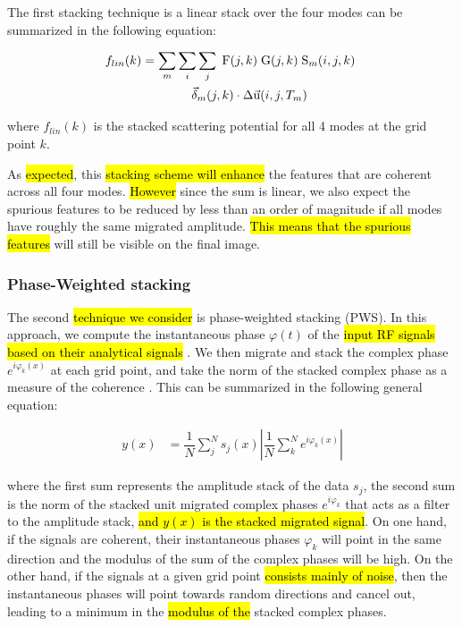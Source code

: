 \documentclass[10pt,a4paper]{article}
\begin{document}
The first stacking technique is a linear stack over the four modes can be summarized in the following equation:

\begin{align}
  f_{lin}(k) &= \sum_m \sum_i \sum_j \; \text{F}(j,k) \; \text{G}(j,k) \; \text{S}_{m}(i,j,k) \; \notag\\&\qquad\qquad \vec{\delta}_{m}(j,k) \cdot \Delta\vec{\text{u}}(i,j,T_m)
  \label{lin}
\end{align}
\vspace{1mm}

\noindent where $f_{lin}(k)$ is the stacked scattering potential for all 4 modes at the grid point $k$. 

As \hl{expected}, this \hl{stacking scheme will enhance} the features that are coherent across all four modes.
\hl{However} since the sum is linear, we also expect the spurious features to be reduced by less than an order of magnitude if all modes have roughly the same migrated amplitude.
\hl{This means that the spurious features} will still be visible on the final image.

\subsubsection{Phase-Weighted stacking}

The second \hl{technique we consider} is phase-weighted stacking (PWS).
In this approach, we compute the instantaneous phase $\varphi(t)$ of the \hl{input RF signals based on their analytical signals} \citep{schi_gji_97,cost_gphy_18}.
We then migrate and stack the complex phase $e^{i\varphi_k(x)}$ at each grid point, and take the norm of the stacked complex phase as a measure of the coherence \citep{coop_saga_07}.
This can be summarized in the following general equation:

\begin{align}
  y(x) &= \dfrac{1}{N} \sum_j^N s_j(x) \left\vert \dfrac{1}{N} \sum_k^N e^{i\varphi_k(x)} \right\vert
  \label{pws_1}
\end{align}
\vspace{1mm}

\noindent where the first sum represents the amplitude stack of the data $s_j$,
the second sum is the norm of the stacked unit migrated complex phases $e^{i\varphi_k}$ that acts as a filter to the amplitude stack,
\hl{and $y(x)$ is the stacked migrated signal}.
On one hand, if the signals are coherent, their instantaneous phases $\varphi_k$ will point in the same direction and the modulus of the sum of the complex phases will be high.
On the other hand, if the signals at a given grid point \hl{consists mainly of noise}, then the instantaneous phases will point towards random directions and cancel out, leading to a minimum in the \hl{modulus of the} stacked complex phases.
\end{document}
